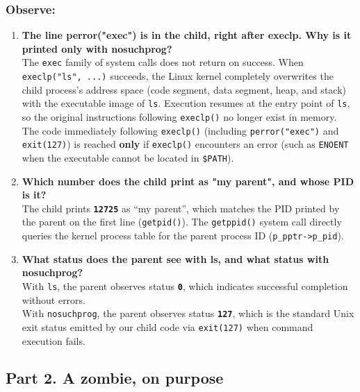 \documentclass{labreport}
\begin{document}
\subsubsection*{Observe:}
\begin{enumerate}[leftmargin=*]
    \item \textbf{The line perror("exec") is in the child, right after execlp. Why is it printed only with nosuchprog?}\\[0.2em]
    The \texttt{exec} family of system calls does not return on success. When \texttt{execlp("ls", ...)} succeeds, the Linux kernel completely overwrites the child process's address space (code segment, data segment, heap, and stack) with the executable image of \texttt{ls}. Execution resumes at the entry point of \texttt{ls}, so the original instructions following \texttt{execlp()} no longer exist in memory.\\
    The code immediately following \texttt{execlp()} (including \texttt{perror("exec")} and \texttt{exit(127)}) is reached \textbf{only} if \texttt{execlp()} encounters an error (such as \texttt{ENOENT} when the executable cannot be located in \texttt{\$PATH}).

    \item \textbf{Which number does the child print as "my parent", and whose PID is it?}\\[0.2em]
    The child prints \textbf{\texttt{12725}} as ``my parent'', which matches the PID printed by the parent on the first line (\texttt{getpid()}). The \texttt{getppid()} system call directly queries the kernel process table for the parent process ID (\texttt{p\_pptr->p\_pid}).

    \item \textbf{What status does the parent see with ls, and what status with nosuchprog?}\\[0.2em]
    With \texttt{ls}, the parent observes status \textbf{\texttt{0}}, which indicates successful completion without errors.\\
    With \texttt{nosuchprog}, the parent observes status \textbf{\texttt{127}}, which is the standard Unix exit status emitted by our child code via \texttt{exit(127)} when command execution fails.
\end{enumerate}

\subsection{Part 2. A zombie, on purpose}
\end{document}
